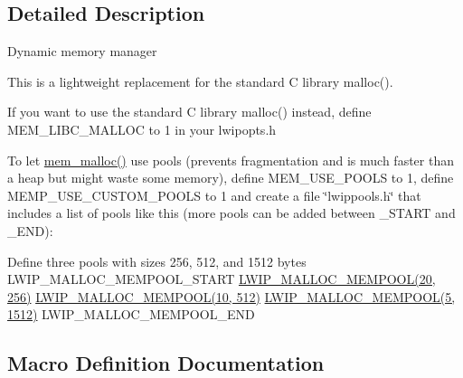 \subsection{Detailed Description}
Dynamic memory manager

This is a lightweight replacement for the standard C library malloc().

If you want to use the standard C library malloc() instead, define M\+E\+M\+\_\+\+L\+I\+B\+C\+\_\+\+M\+A\+L\+L\+OC to 1 in your lwipopts.\+h

To let \hyperlink{native_2lwip_2src_2core_2mem_8c_a932aa40d85b14cb7331625e012d12335}{mem\+\_\+malloc()} use pools (prevents fragmentation and is much faster than a heap but might waste some memory), define M\+E\+M\+\_\+\+U\+S\+E\+\_\+\+P\+O\+O\+LS to 1, define M\+E\+M\+P\+\_\+\+U\+S\+E\+\_\+\+C\+U\+S\+T\+O\+M\+\_\+\+P\+O\+O\+LS to 1 and create a file \char`\"{}lwippools.\+h\char`\"{} that includes a list of pools like this (more pools can be added between \+\_\+\+S\+T\+A\+RT and \+\_\+\+E\+ND)\+:

Define three pools with sizes 256, 512, and 1512 bytes L\+W\+I\+P\+\_\+\+M\+A\+L\+L\+O\+C\+\_\+\+M\+E\+M\+P\+O\+O\+L\+\_\+\+S\+T\+A\+RT \hyperlink{openmote-cc2538_2lwip_2src_2include_2lwip_2priv_2memp__std_8h_a2a2ee070ed2e841bdf67f9379780e03d}{L\+W\+I\+P\+\_\+\+M\+A\+L\+L\+O\+C\+\_\+\+M\+E\+M\+P\+O\+O\+L(20, 256)} \hyperlink{openmote-cc2538_2lwip_2src_2include_2lwip_2priv_2memp__std_8h_a2a2ee070ed2e841bdf67f9379780e03d}{L\+W\+I\+P\+\_\+\+M\+A\+L\+L\+O\+C\+\_\+\+M\+E\+M\+P\+O\+O\+L(10, 512)} \hyperlink{openmote-cc2538_2lwip_2src_2include_2lwip_2priv_2memp__std_8h_a2a2ee070ed2e841bdf67f9379780e03d}{L\+W\+I\+P\+\_\+\+M\+A\+L\+L\+O\+C\+\_\+\+M\+E\+M\+P\+O\+O\+L(5, 1512)} L\+W\+I\+P\+\_\+\+M\+A\+L\+L\+O\+C\+\_\+\+M\+E\+M\+P\+O\+O\+L\+\_\+\+E\+ND 

\subsection{Macro Definition Documentation}
\mbox{\label{openmote-cc2538_2lwip_2src_2core_2mem_8c_a016a07ea84e1d75386765b90015b6698}} 
